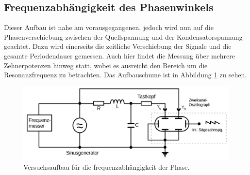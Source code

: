 \subsection{Frequenzabhängigkeit des Phasenwinkels}
Dieser Aufbau ist nahe am vorausgegangenen, jedoch wird nun auf die Phasenverschiebung zwischen der Quellspannung und der Kondensatorspannung geachtet.
Dazu wird einerseits die zeitliche Verschiebung der Signale und die gesamte Periodendauer gemessen.
Auch hier findet die Messung über mehrere Zehnerpotenzen hinweg statt,
wobei es ausreicht den Bereich um die Resonanzfrequenz zu betrachten.
Das Aufbauschume ist in Abbildung \ref{fig:aufbau4} zu sehen.
\begin{figure}[H]
    \centering
    \caption{Versuchsaufbau für die frequenzabhängigkeit der Phase.\cite{v354}}
    \label{fig:aufbau4}
    \includegraphics[width=\textwidth]{content/aufbau4.png}
\end{figure}
\noindent
%
